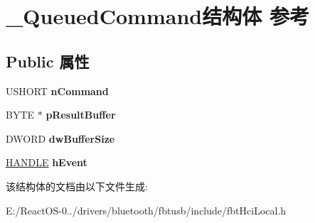 \hypertarget{struct___queued_command}{}\section{\+\_\+\+Queued\+Command结构体 参考}
\label{struct___queued_command}
\subsection*{Public 属性}
\begin{DoxyCompactItemize}
\item 
\mbox{\label{struct___queued_command_a26261e1472d519d4e918b9f6b80ba474}} 
U\+S\+H\+O\+RT {\bfseries n\+Command}
\item 
\mbox{\label{struct___queued_command_aeaa0301cb2b1fd248d72ea10c009d426}} 
B\+Y\+TE $\ast$ {\bfseries p\+Result\+Buffer}
\item 
\mbox{\label{struct___queued_command_a8d3e38044c33be9b5c562a39300096ed}} 
D\+W\+O\+RD {\bfseries dw\+Buffer\+Size}
\item 
\mbox{\label{struct___queued_command_a558b02ccc347e4b23967feac0a18feb6}} 
\hyperlink{interfacevoid}{H\+A\+N\+D\+LE} {\bfseries h\+Event}
\end{DoxyCompactItemize}


该结构体的文档由以下文件生成\+:\begin{DoxyCompactItemize}
\item 
E\+:/\+React\+O\+S-\/0../drivers/bluetooth/fbtusb/include/fbt\+Hci\+Local.\+h\end{DoxyCompactItemize}
